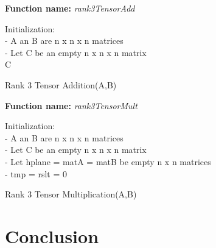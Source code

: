 \documentclass[11pt]{article} %
\begin{document}
\bigbreak
\begin{algorithm}[H]
\SetAlgoLined
\textbf{Function name:} \emph{rank3TensorAdd}

Initialization\::\\ 
- A an B are n x n x n matrices\\
- Let C be an empty n x n x n matrix\\

\Return C

\caption{Rank 3 Tensor Addition(A,B)}
\end{algorithm}
\bigbreak
\begin{algorithm}[H]
\SetAlgoLined
\textbf{Function name:} \emph{rank3TensorMult}

Initialization\::\\ 
- A an B are n x n x n matrices\\
- Let C be an empty n x n x n matrix\\
- Let hplane = matA = matB be empty n x n matrices\\
- tmp = rslt = 0\\


\caption{Rank 3 Tensor Multiplication(A,B)}
\end{algorithm}

\section{Conclusion}\
\end{document}
